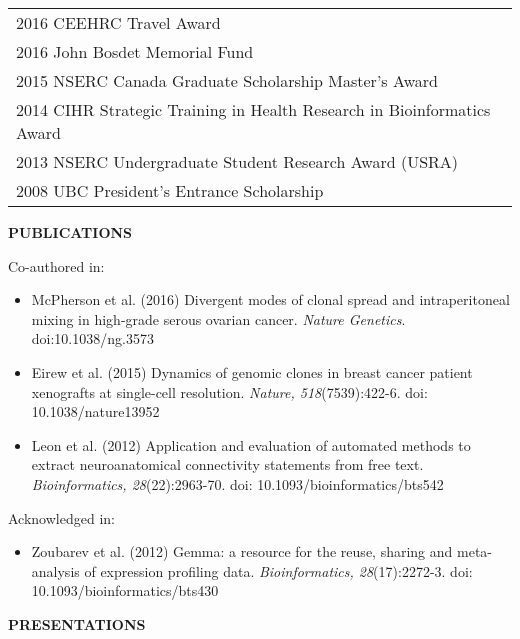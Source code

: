 \documentclass{res}
\renewcommand{\section}[1]{%
  \vspace{0.3in}%
  \centerline{\uppercase{\bf{#1}}}%
  \vspace{-6pt}}
\newcommand{\lineaward}[2]{%
  #1 \faTrophy{} #2\\[1ex]}
\newenvironment{publicationlists}{%
  \begin{itemize}\leftmargin=3em \itemindent=-1em \itemsep=2pt%
  }{%
  \end{itemize}}
\begin{document}
\begin{resume}
\begin{center}
  \begin{tabular}{l}
    \lineaward{2016}{CEEHRC Travel Award}
    \lineaward{2016}{John Bosdet Memorial Fund}
    \lineaward{2015}{NSERC Canada Graduate Scholarship Master's Award}
    \lineaward{2014}{CIHR Strategic Training in Health Research in Bioinformatics Award}
    \lineaward{2013}{NSERC Undergraduate Student Research Award (USRA)}
    \lineaward{2008}{UBC President's Entrance Scholarship}
  \end{tabular}
\end{center}
\vspace{-1em}

\section{Publications}

Co-authored in:\vspace{4pt}
\begin{publicationlists}
  \item McPherson et al. (2016) Divergent modes of clonal spread and intraperitoneal mixing in high-grade serous ovarian cancer. {\sl Nature Genetics}. doi:10.1038/ng.3573
  \item Eirew et al. (2015) Dynamics of genomic clones in breast cancer patient xenografts at single-cell resolution. {\sl Nature, 518}(7539):422-6. doi: 10.1038/nature13952
  \item Leon et al. (2012) Application and evaluation of automated methods to extract neuroanatomical connectivity statements from free text. {\sl Bioinformatics, 28}(22):2963-70. doi: 10.1093/bioinformatics/bts542
\end{publicationlists}

Acknowledged in:\vspace{4pt}
\begin{publicationlists}
  \item Zoubarev et al. (2012) Gemma: a resource for the reuse, sharing and meta-analysis of expression profiling data. {\sl Bioinformatics, 28}(17):2272-3. doi: 10.1093/bioinformatics/bts430
\end{publicationlists}

\pagebreak
\section{Presentations}


\end{resume}
\end{document}
